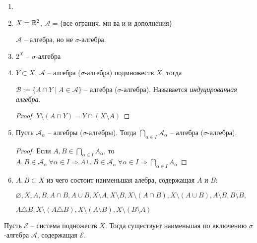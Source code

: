 \begin{example} 
    \begin{enumerate}
        \item[]
        \item $X=\mathbb{R}^2$, $\mathcal{A} = \{\text{все огранич. мн-ва и и дополнения}\}$
        
        $\mathcal{A}$ – алгебра, но не $\sigma$-алгебра.

        \item $2^X$ – $\sigma$-алгебра
        
        \item $Y\subset X$, $\mathcal{A}$ – алгебра ($\sigma$-алгебра) подмножеств $X$, тогда
        
        $\mathcal{B} := \{ A\cap Y \mid A\in \mathcal{A}\}$ – алгебра ($\sigma$-алгебра). Называется \textit{индуцированная алгебра}.

        \begin{proof}
            $Y \setminus (A\cap Y) = Y \cap (X \setminus A)$
        \end{proof}

        \item Пусть $\mathcal{A}_\alpha$ – алгебры ($\sigma$-алгебры). Тогда $\bigcap\limits_{\alpha \in I} \mathcal{A}_\alpha$ – алгебра ($\sigma$-алгебра).
        
        \begin{proof}
            Если $A, B\in \bigcap\limits_{\alpha \in I} A_\alpha$, то $A, B\in \mathcal{A}_\alpha\ \forall \alpha \in I\Rightarrow A\cup B \in \mathcal{A}_\alpha\ \forall \alpha \in I\Rightarrow \bigcap\limits_{\alpha \in I} A_\alpha$
        \end{proof}

        \item $A, B\subset X$ из чего состоит наименьшая алебра, содержащая $A$ и $B$:
        
        $\varnothing, X, A, B, A\cap B, A \cup B, X \setminus A,  X \setminus B,  X \setminus (A\cap B),  X \setminus (A\cup B), A\setminus B, B\setminus B,$
        
        $A\triangle B, X \setminus (A\triangle B), X\setminus (A\setminus B), X\setminus (B\setminus A)$
    \end{enumerate}
\end{example}

\begin{theorem}
    Пусть $\mathcal{E}$ – система подножеств $X$. Тогда существует наименьшая по включению $\sigma$-алгебра $\mathcal{A}$,
    содержащая $\mathcal{E}$.
\end{theorem}

